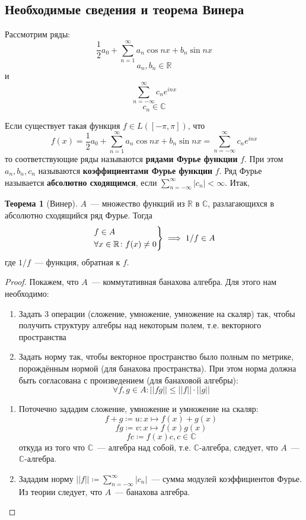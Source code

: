 \documentclass[12pt]{extarticle}
\theoremstyle{definition}
\newtheorem{theorem}{\indent Теорема}[section]
\begin{document}
  	\subsection{Необходимые сведения и теорема Винера}
  		Рассмотрим ряды:
  		$$\frac{1}{2}a_0+\sum_{n=1}^{\infty} a_n \cos nx+b_n \sin nx$$ $$a_n,b_n\in\mathbb{R}$$
  		и
  		$$\sum_{n=-\infty}^\infty c_n e^{inx}$$
  		$$c_n\in\mathbb{C}$$

  		Если существует такая функция $f\in L([-\pi,\pi])$, что $$f(x)=\frac{1}{2}a_0+\sum_{n=1}^{\infty} a_n \cos nx+b_n \sin nx=\sum_{n=-\infty}^\infty c_n e^{inx}$$
  		то соответствующие ряды называются \textbf{рядами Фурье функции} $f$. При этом $a_n,b_n, c_n$ называются \textbf{коэффициентами Фурье функции} $f$. Ряд Фурье называется \textbf{абсолютно сходящимся}, если $\sum_{n=-\infty}^\infty |c_n|<\infty$. Итак,
        \begin{theorem}[Винер]\label{th:Wiener}
        $A$~--- множество функций из $\mathbb{R}$ в $\mathbb{C}$, разлагающихся в абсолютно сходящийся ряд Фурье. Тогда
      $$
    \begin{drcases}
		f\in A\\
		 \forall x\in\mathbb{R}\colon  f(x)\neq 0
    \end{drcases}\implies 1/f\in A
    $$
    где $1/f$~--- функция, обратная к $f$.
    \begin{proof}
		Покажем, что $A$~--- коммутативная банахова алгебра. Для этого нам необходимо:
		\begin{enumerate}
			\item Задать 3 операции (сложение, умножение, умножение на скаляр) так, чтобы получить структуру алгебры над некоторым полем, т.е. векторного пространства
			\item Задать норму так, чтобы векторное пространство было полным по метрике, порождённым нормой (для банахова пространства). При этом норма должна быть согласована с произведением (для банаховой алгебры):
			$$\forall f,g\in A\colon  ||fg||\leq ||f||\cdot||g||$$
		\end{enumerate}
		\begin{enumerate}
			\item Поточечно зададим сложение, умножение и умножение на скаляр:
				$$
			f+g\coloneq u\colon x\mapsto f(x)+g(x)
			$$
			$$fg\coloneq v\colon x\mapsto f(x)g(x)$$
			$$fc\coloneq f(x)c,c\in\mathbb{C}$$
			откуда из того что $\mathbb{C}$~--- алгебра над собой, т.е. $\mathbb{C}$-алгебра, следует, что $A$~--- $\mathbb{C}$-алгебра.
			\item Зададим норму $||f||\coloneq\sum_{n=-\infty}^\infty |c_n|$~--- сумма модулей коэффициентов Фурье. Из теории следует, что $A$~--- банахова алгебра.
		\end{enumerate}


\end{proof}
\end{theorem}
\end{document}
